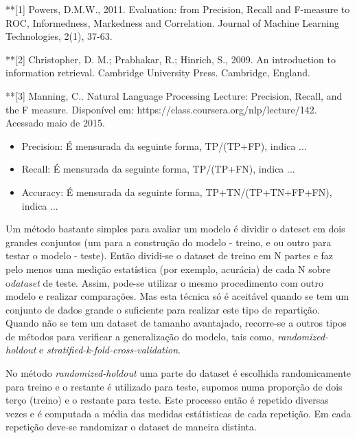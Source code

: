 **[1] Powers, D.M.W., 2011. Evaluation: from Precision, Recall and F-measure to ROC, Informedness, Markedness and Correlation. Journal of Machine Learning Technologies, 2(1), 37-63.

**[2] Christopher, D. M.; Prabhakar, R.; Hinrich, S., 2009. An introduction to information retrieval. Cambridge University Press. Cambridge, England.

**[3] Manning, C.. Natural Language Processing Lecture: Precision, Recall, and the F measure.
Disponível em: https://class.coursera.org/nlp/lecture/142. Acessado maio de 2015.

\begin{itemize}
\item Precision: É mensurada da seguinte forma, TP/(TP+FP), indica ...  
\item Recall: É mensurada da seguinte forma, TP/(TP+FN), indica ...
\item Accuracy: É mensurada da seguinte forma, TP+TN/(TP+TN+FP+FN), indica ...
\end{itemize}
                    
Um método bastante simples para avaliar um modelo é dividir o dateset em dois grandes conjuntos (um para a construção do modelo - treino, e ou outro para testar o modelo - teste). Então dividi-se o dataset de treino em N partes e faz pelo menos uma medição estatística (por exemplo, acurácia) de cada N sobre o\textit{dataset} de teste. Assim, pode-se utilizar o mesmo procedimento com outro modelo e realizar comparações. Mas esta técnica só é aceitável quando se tem um conjunto de dados grande o suficiente para realizar este tipo de repartição.\cite{Kotsiantis:2007} Quando não se tem um dataset de tamanho avantajado, recorre-se a outros tipos de métodos para verificar a generalização do modelo, tais como, \textit{randomized-holdout} e \textit{stratified-k-fold-cross-validation}.\cite{Witten:2005}

No método \textit{randomized-holdout} uma parte do dataset é escolhida randomicamente para treino e o restante é utilizado para teste, supomos numa proporção de dois terço (treino) e o restante para teste. Este processo então é repetido diversas vezes e é computada a média das medidas estátisticas de cada repetição. Em cada repetição deve-se randomizar o dataset de maneira distinta.\cite{Witten:2005} 


